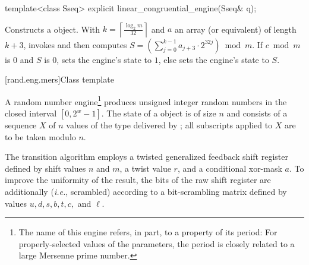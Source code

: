 %

\begin{itemdecl}
template<class Sseq> explicit linear_congruential_engine(Sseq& q);
\end{itemdecl}

\begin{itemdescr}
\pnum\effects Constructs a  object.
 With
 $ k = \left\lceil \frac{\log_2 m}
                        {32}
            \right\rceil
 $
 and $a$ an array (or equivalent)
 of length $k + 3$,
 invokes 
 and then computes
 $ S = \left(\sum_{j=0}^{k-1}a_{j+3} \cdot 2^{32j} \right) \bmod m $.
 If
   $ c \bmod m $ is $0$
 and
   $S$ is $0$,
 sets the engine's state to $1$,
 else sets the engine's state
 to $S$.
\end{itemdescr}


[rand.eng.mers]{Class template }%
%

\pnum
A  random number
engine\footnote{The name of this engine refers, in part, to a property of its period:
 For properly-selected values of the parameters,
 the period is closely related to a large Mersenne prime number.}
produces unsigned integer random numbers
in the closed interval $[0,2^w-1]$.
The
%
%
state
of a  object 
is of size $n$
and consists of a sequence $X$
of $n$ values of the type delivered by ;
all subscripts applied to $X$ are to be taken modulo $n$.

\pnum
The transition algorithm%
%
employs a twisted generalized feedback shift register
defined by shift values $n$ and $m$, a twist value $r$,
and a conditional xor-mask $a$.
To improve the uniformity of the result,
the bits of the raw shift register are additionally 
(\textit{i.e.}, scrambled)
according to a bit-scrambling matrix
defined by values $u, d, s, b, t, c,$ and $\ell$.

